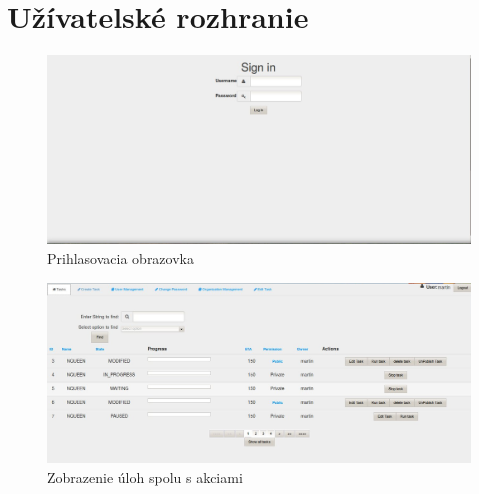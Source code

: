 {}

\chapter{Užívatelské rozhranie}
{
	\begin{figure}[htb]

\begin{center}

\includegraphics[scale=0.5]{page5.jpg} 
\caption{Prihlasovacia obrazovka }


\end{center}

\end{figure}


\begin{figure}[htb]

\begin{center}

\includegraphics[scale=0.5]{page.jpg} 
\caption{Zobrazenie úloh spolu s akciami }


\end{center}

\end{figure}



\begin{figure}[htb]

\begin{center}


\end{center}
\end{figure}}
